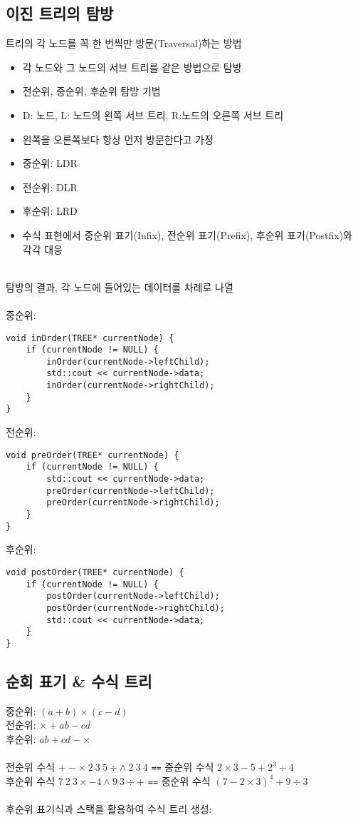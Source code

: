 \subsection{이진 트리의 탐방}
트리의 각 노드를 꼭 한 번씩만 방문(Traversal)하는 방법
\begin{itemize}
    \item 각 노드와 그 노드의 서브 트리를 같은 방법으로 탐방
    \item 전순위, 중순위, 후순위 탐방 기법
    \item D: 노드, L: 노드의 왼쪽 서브 트리, R:노드의 오른쪽 서브 트리
    \item 왼쪽을 오른쪽보다 항상 먼저 방문한다고 가정
    \item 중순위: LDR
    \item 전순위: DLR
    \item 후순위: LRD
    \item 수식 표현에서 중순위 표기(Infix), 전순위 표기(Prefix), 후순위 표기(Postfix)와 각각 대응
\end{itemize}\phantom{}\\
탐방의 결과, 각 노드에 들어있는 데이터를 차례로 나열\\\\
중순위:
\begin{verbatim}
void inOrder(TREE* currentNode) {
    if (currentNode != NULL) {
        inOrder(currentNode->leftChild);
        std::cout << currentNode->data;
        inOrder(currentNode->rightChild);
    }
}
\end{verbatim}
전순위:
\begin{verbatim}
void preOrder(TREE* currentNode) {
    if (currentNode != NULL) {
        std::cout << currentNode->data;
        preOrder(currentNode->leftChild);
        preOrder(currentNode->rightChild);
    }
}
\end{verbatim}
후순위:
\begin{verbatim}
void postOrder(TREE* currentNode) {
    if (currentNode != NULL) {
        postOrder(currentNode->leftChild);
        postOrder(currentNode->rightChild);
        std::cout << currentNode->data;
    }
}
\end{verbatim}

\subsection{순회 표기 \& 수식 트리}
중순위: $(a+b)\times(c-d)$\\
전순위: $\times + ab-cd$\\
후순위: $ab+cd-\times$\\\\
전순위 수식 $+-\times\ 2\ 3\ 5 \div \wedge\  2\ 3\ 4$ \texttt{==} 중순위 수식 $2 \times 3 - 5 + 2^3 \div 4$\\
후순위 수식 $7\ 2\ 3\times - 4 \wedge 9\ 3 \div +$ \texttt{==} 중순위 수식 $(7 - 2 \times 3)^4 + 9 \div 3$
\\\\
후순위 표기식과 스택을 활용하여 수식 트리 생성:

